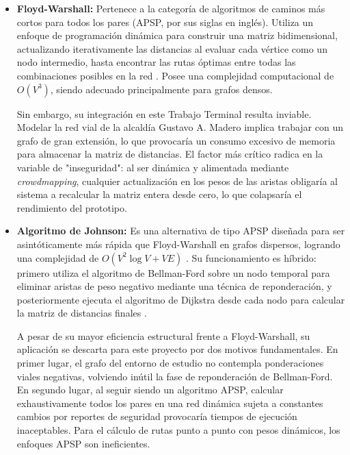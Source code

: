 \begin{itemize}

    \item \textbf{Floyd-Warshall:} Pertenece a la categoría de algoritmos de caminos más cortos para todos los pares (APSP, por sus siglas en inglés). Utiliza un enfoque de programación dinámica para construir una matriz bidimensional, actualizando iterativamente las distancias al evaluar cada vértice como un nodo intermedio, hasta encontrar las rutas óptimas entre todas las combinaciones posibles en la red \cite{gfg_floyd_warshall, gfg_floyd_warshall_cpp, gfg_floyd_warshall_c}. Posee una complejidad computacional de $O(V^3)$, siendo adecuado principalmente para grafos densos.
    
    Sin embargo, su integración en este Trabajo Terminal resulta inviable. Modelar la red vial de la alcaldía Gustavo A. Madero implica trabajar con un grafo de gran extensión, lo que provocaría un consumo excesivo de memoria para almacenar la matriz de distancias. El factor más crítico radica en la variable de "inseguridad": al ser dinámica y alimentada mediante \textit{crowdmapping}, cualquier actualización en los pesos de las aristas obligaría al sistema a recalcular la matriz entera desde cero, lo que colapsaría el rendimiento del prototipo.

    \item \textbf{Algoritmo de Johnson:} Es una alternativa de tipo APSP diseñada para ser asintóticamente más rápida que Floyd-Warshall en grafos dispersos, logrando una complejidad de $O(V^2 \log V + VE)$ \cite{enjoyalgorithms_graphs}. Su funcionamiento es híbrido: primero utiliza el algoritmo de Bellman-Ford sobre un nodo temporal para eliminar aristas de peso negativo mediante una técnica de reponderación, y posteriormente ejecuta el algoritmo de Dijkstra desde cada nodo para calcular la matriz de distancias finales \cite{book_algoritmos_johnson}.
    
    A pesar de su mayor eficiencia estructural frente a Floyd-Warshall, su aplicación se descarta para este proyecto por dos motivos fundamentales. En primer lugar, el grafo del entorno de estudio no contempla ponderaciones viales negativas, volviendo inútil la fase de reponderación de Bellman-Ford. En segundo lugar, al seguir siendo un algoritmo APSP, calcular exhaustivamente todos los pares en una red dinámica sujeta a constantes cambios por reportes de seguridad provocaría tiempos de ejecución inaceptables. Para el cálculo de rutas punto a punto con pesos dinámicos, los enfoques APSP son ineficientes.


\end{itemize}
